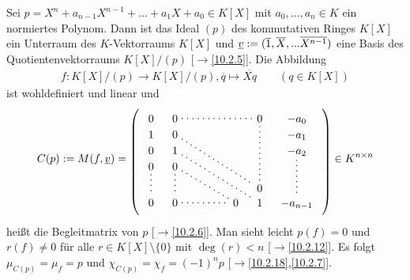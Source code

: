 \documentclass[../../main.tex]{subfiles}
\begin{document}
\begin{er}\label{17.5.1}
Sei $p=X^n+a_{n-1}X^{n-1}+...+a_1X+a_0\in K[X]$ mit $a_0,...,a_n\in K$ ein normiertes Polynom. Dann ist das Ideal $(p)$ des kommutativen Ringes $K[X]$ ein Unterraum des $K$-Vektorraums $K[X]$ und ${\underline v}:=(\overline{1},\overline{X},...\overline{X^{n-1}})$ eine Basis des Quotientenvektorraums $K[X]/(p)$ [$\to$\ref{10.2.5}]. Die Abbildung
\begin{align*}
f: K[X]/(p)\to K[X]/(p), \overline{q}\mapsto \overline{Xq}\qquad(q\in K[X])
\end{align*}
ist wohldefiniert und linear und
\begin{equation*}
C(p):=M(f,\v)=
\begin{tikzpicture}[loosely dotted,thick,baseline]
\matrix (m) [matrix of math nodes,nodes in empty cells,right delimiter=),left delimiter=(,column sep=1em]{
0&0&&&&0&-a_0\\
1&0&&&&  &-a_1\\
0&1&&&&  &-a_2\\
0&0\\
\\
 &   &&&&0\\
0&0&&&0&1&-a_{n-1}\\
} ;
\draw (m-1-2)-- (m-1-6);
\draw (m-2-2)-- (m-6-6);
\draw (m-3-2)-- (m-7-6);
\draw (m-4-2)-- (m-7-5);
\draw (m-1-6)-- (m-6-6);
\draw (m-3-7)-- (m-7-7);
\draw (m-4-1)-- (m-7-1);
\draw (m-4-2)-- (m-7-2) -- (m-7-5);
\end{tikzpicture}\in K^{n\times n}
\end{equation*}
heißt die Begleitmatrix von $p$ [$\to$\ref{10.2.6}]. Man sieht leicht $p(f)=0$ und $r(f)\neq 0$ für alle $r\in K[X]\setminus\{0\}$ mit $\deg(r)<n$ [$\to$\ref{10.2.12}]. Es folgt $\mu_{C(p)}=\mu_f=p$ und $\chi_{C(p)}=\chi_f=(-1)^np$ [$\to$\ref{10.2.18},\ref{10.2.7}].
\end{er}
\end{document}
